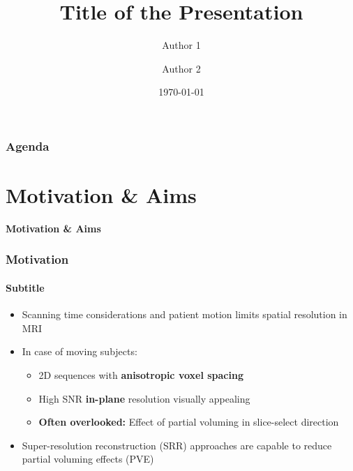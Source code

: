 \documentclass[compress,12pt]{beamer} %
\title[Short Title]{Title of the Presentation}
\author[Auth. 1 \and Auth.2]{Author 1 \and Author 2}
\institute[UCL]{%
  Translational Imaging Group, CMIC\\%
  University College London
}
\date{\today}
\def\headline#1{\begin{frame}[c]\centering\color{headlinecolor}\LARGE\bfseries#1\end{frame}}
\begin{document}
\begin{frame}
  \titlepage
\end{frame}


\begin{frame}[t]\frametitle{Agenda}
   \tableofcontents%
\end{frame}



\section{Motivation \& Aims}
\headline{Motivation \& Aims}


\begin{frame}[t]\frametitle{Motivation}\framesubtitle{Subtitle}
    \begin{itemize}[<+->]\setlength{\itemsep}{12pt}
        \item Scanning time considerations and patient motion limits spatial resolution in MRI
        \item In case of moving subjects:
        \begin{itemize}
            \item 2D sequences with {\bf anisotropic voxel spacing}
            \item High SNR {\bf in-plane} resolution visually appealing
            \item \textbf{Often overlooked:} Effect of partial voluming in slice-select direction
        \end{itemize}
        \item Super-resolution reconstruction (SRR) approaches are capable to reduce partial voluming effects (PVE)
    \end{itemize}
\end{frame}
\end{document}
